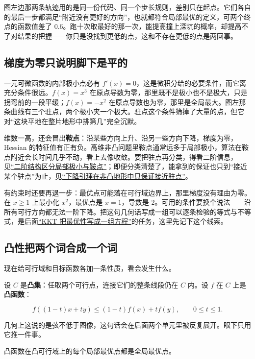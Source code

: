图左边那两条轨迹用的是同一份代码、同一个步长规则，差别只在起点。它们各自的最后一步都满足``附近没有更好的方向''，也就都符合局部最优的定义，可两个终点的函数值差了 \(0.6\)。跑十次取最好的那一次，能提高撞上深坑的概率，却提高不了对结果的把握——你只是没找到更低的点，这和不存在更低的点是两回事。

\subsection{梯度为零只说明脚下是平的}

一元可微函数的内部极小点必有 \(f'(x)=0\)，这是微积分给的必要条件，而它离充分条件很远。\(f(x)=x^3\) 在原点导数为零，那里既不是极小也不是极大，只是拐弯前的一段平缓；\(f(x)=-x^2\) 在原点导数也为零，那里是全局最大。图左那条曲线有三个驻点，两个极小夹一个极大。驻点这个条件筛掉了大量的点，但它对``这块平地在整片地形中排第几''完全沉默。

维数一高，还会冒出\textbf{鞍点}：沿某些方向上升、沿另一些方向下降，梯度为零，Hessian 的特征值有正有负。高维非凸问题里鞍点通常远多于局部极小，算法在鞍点附近会长时间几乎不动，看上去像收敛。要把驻点再分类，得看二阶信息，见\hyperref[sec:09-Convex-Optimization/08-Nonconvex-and-Stochastic-Optimization/02]{``二阶结构区分局部极小与鞍点''}；即便分类清楚了，能拿到的保证也只到``接近某个驻点''为止，见\hyperref[sec:09-Convex-Optimization/08-Nonconvex-and-Stochastic-Optimization/01]{``下降引理在非凸地形中只保证接近驻点''}。

有约束时还要再退一步：最优点可能落在可行域边界上，那里梯度没有理由为零。在 \(x\ge1\) 上最小化 \(x^2\)，最优点是 \(x=1\)，导数是 \(2\)。可用的条件要换个说法——沿所有可行方向都无法一阶下降。把这句几何话写成一组可以逐条检验的等式与不等式，是后面\hyperref[sec:09-Convex-Optimization/05-Duality/03]{``KKT 把最优性写成一组方程''}的任务，这里先记下这个线索。

\subsection{凸性把两个词合成一个词}

现在给可行域和目标函数各加一条性质，看会发生什么。

设 \(C\) 是\textbf{凸集}：任取两个可行点，连接它们的整条线段仍在 \(C\) 内。设 \(f\) 在 \(C\) 上是\textbf{凸函数}：

\[
f((1-t)x+ty)\le(1-t)f(x)+tf(y),\qquad 0\le t\le1.
\]

几何上这说的是弦不低于图像，这句话会在后面两个单元里被反复展开。眼下只用它推一件事。

\begin{theorem}
凸函数在凸可行域上的每个局部最优点都是全局最优点。
\end{theorem}

